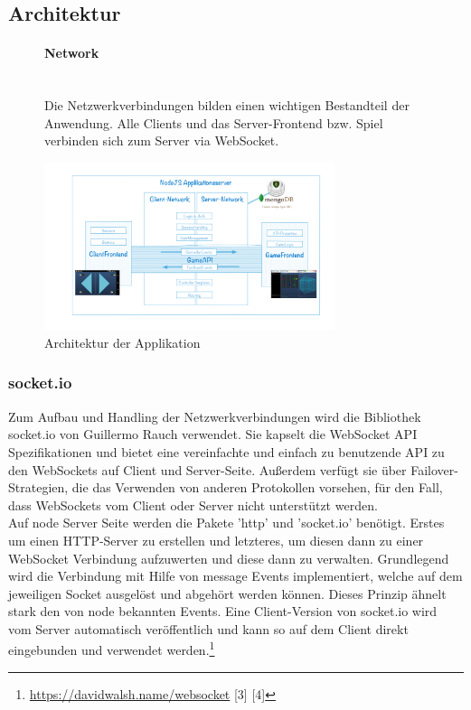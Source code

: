 \documentclass[a4paper]{spie}  %
\begin{document}
\subsection{Architektur}
\begin{figure}[H]
	\begin{minipage}[t]{0.4\textwidth}
		\vspace{0pt}
		\paragraph{Network}\mbox{}\\
		Die Netzwerkverbindungen bilden einen wichtigen Bestandteil der Anwendung. Alle Clients und das Server-Frontend bzw. Spiel verbinden sich zum Server via WebSocket.
	\end{minipage}
	\hfill
	\begin{minipage}[t]{0.5\textwidth}
		\vspace{0pt}
		\includegraphics[width=8.5cm]{images/arch/M113.png}
		\caption{Architektur der Applikation}
		\label{fig:test2}
	\end{minipage}
\end{figure}



\subsubsection{socket.io}\label{socketio}
Zum Aufbau und Handling der Netzwerkverbindungen wird die Bibliothek socket.io von Guillermo Rauch verwendet. Sie kapselt die WebSocket API Spezifikationen und bietet eine vereinfachte und einfach zu benutzende API zu den WebSockets auf Client und Server-Seite. Außerdem verfügt sie über Failover-Strategien, die das Verwenden von anderen Protokollen vorsehen, für den Fall, dass WebSockets vom Client oder Server nicht unterstützt werden.\\
Auf node Server Seite werden die Pakete 'http' und 'socket.io' benötigt. Erstes um einen HTTP-Server zu erstellen und letzteres, um diesen dann zu einer WebSocket Verbindung aufzuwerten und diese dann zu verwalten. Grundlegend wird die Verbindung mit Hilfe von message Events implementiert, welche auf dem jeweiligen Socket ausgelöst und abgehört werden können. Dieses Prinzip ähnelt stark den von node bekannten Events. Eine Client-Version von socket.io wird vom Server automatisch veröffentlich und kann so auf dem Client direkt eingebunden und
verwendet werden.\footnote{\url{https://davidwalsh.name/websocket} [3] [4]}
\end{document}
